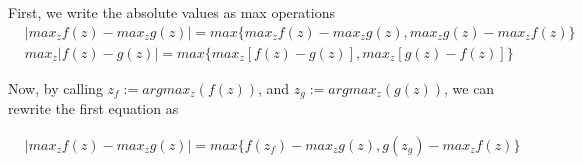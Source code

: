 \documentclass{exam}
\begin{document}
\begin{problem}
\begin{enumerate}
\begin{enumerate}[(a)]
\begin{solutionorlines}[2in]
            
            
            
            First, we write the absolute values as max operations
            \begin{align}
                &|max_z f(z) - max_z g(z)| = max \{ max_z f(z) - max_z g(z), max_z g(z) - max_z f(z) \} \\
                &max_z |f(z) - g(z)| = max \{ max_z [f(z) - g(z)], max_z [g(z) - f(z)] \}
            \end{align}
            
            Now, by calling $z_f := {argmax_z}(f(z))$, and $z_g := {argmax_z}(g(z)) $, we can rewrite the first equation as
            
            \begin{align}
                &|max_z f(z) - max_z g(z)| = max \{ f(z_f) - max_z g(z), g(z_g) - max_z f(z) \} 
            \end{align}
            

\end{solutionorlines}
\end{enumerate}
\end{enumerate}
\end{problem}
\end{document}
